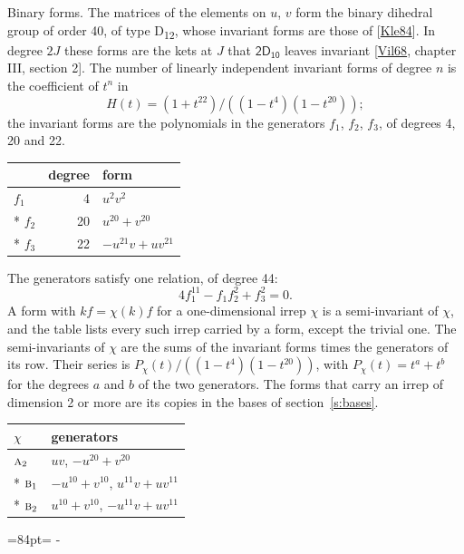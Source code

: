 \documentclass[10pt,a4paper]{article}
\makeatletter
\renewcommand\paragraph{\@startsection{paragraph}{4}{\z@}{1.5ex plus .5ex minus .2ex}{-1em}%
  {\normalfont\small\sffamily\bfseries\color{parttitle}}}
\newcommand{\needspace}[1]{\par\penalty-100\begingroup\dimen0=#1\relax\dimen2=\pagegoal
  \advance\dimen2-\pagetotal\ifdim\dimen0>\dimen2\relax\ifdim\dimen2>0pt\vfil\break\fi\fi
  \endgroup}
\numberwithin{equation}{section}
\newcommand{\grp}[1]{\mathsf{#1}}
\newcommand{\irr}[1]{\text{\normalfont\scshape #1}}
\makeatother
\begin{document}
\paragraph{Binary forms.}
The matrices of the elements on $u$, $v$ form the binary dihedral group of order 40, of type D\textsubscript{12}, whose invariant forms are those of [\href{../../../REFERENCES.pdf\#ref.Kle84}{Kle84}]. In degree $2J$ these forms are the kets at $J$ that $\grp{2D_{10}}$ leaves invariant [\href{../../../REFERENCES.pdf\#ref.Vil68}{Vil68}, chapter III, section 2]. \label{n:head.degree}\label{n:head.form}The number of linearly independent invariant forms of degree $n$ is the coefficient of $t^n$ in
\begin{equation}\label{e:molien}H(t) = (1 + t^{22})/((1-t^{4})(1-t^{20}));\end{equation}
the invariant forms are the polynomials in the generators $f_1$, $f_2$, $f_3$, of degrees 4, 20 and 22.
{\small\begin{longtable}{@{}lrl@{}}\toprule
& degree & form\\\midrule\endhead
\bottomrule\endfoot\endlastfoot
$f_{1}$ & 4 & $u^{2}v^{2}$\\*
$f_{2}$ & 20 & $u^{20} + v^{20}$\\*
$f_{3}$ & 22 & $-u^{21}v + uv^{21}$\\
\bottomrule\end{longtable}}
The generators satisfy one relation, of degree 44:
\begin{equation}\label{e:relation}4f_{1}^{11} - f_{1}f_{2}^{2} + f_{3}^{2} = 0.\end{equation}
A form with $k f = \chi(k) f$ for a one-dimensional irrep $\chi$ is a semi-invariant of $\chi$, and the table lists every such irrep carried by a form, except the trivial one. \label{n:head.generators}The semi-invariants of $\chi$ are the sums of the invariant forms times the generators of its row. Their series is $P_\chi(t)/((1-t^{4})(1-t^{20}))$, with $P_\chi(t) = t^{a} + t^{b}$ for the degrees $a$ and $b$ of the two generators. The forms that carry an irrep of dimension 2 or more are its copies in the bases of section~\ref{s:bases}.
{\small\begin{longtable}{@{}ll@{}}\toprule
$\chi$ & generators\\\midrule\endhead
\bottomrule\endfoot\endlastfoot
$\irr{a}_{2}$ & $uv$, $-u^{20} + v^{20}$\\*
$\irr{b}_{1}$ & $-u^{10} + v^{10}$, $u^{11}v + uv^{11}$\\*
$\irr{b}_{2}$ & $u^{10} + v^{10}$, $-u^{11}v + uv^{11}$\\
\bottomrule\end{longtable}}
\needspace{84pt}
\end{document}
